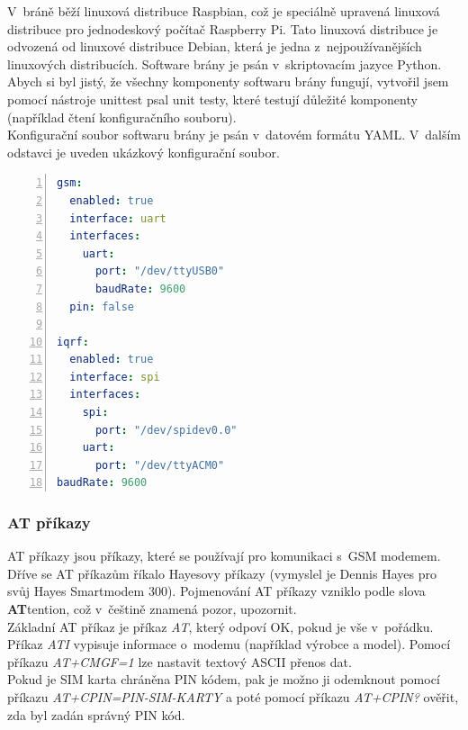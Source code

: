 \documentclass[12pt,a4paper,oneside]{article}
\begin{document}
V~bráně běží linuxová distribuce Raspbian, což je speciálně upravená linuxová distribuce pro jednodeskový počítač Raspberry Pi. Tato linuxová distribuce je odvozená od linuxové distribuce Debian, která je jedna z~nejpoužívanějších linuxových distribucích. Software brány je psán v~skriptovacím jazyce Python. Abych si byl jistý, že všechny komponenty softwaru brány fungují, vytvořil jsem pomocí nástroje unittest psal unit testy, které testují důležité komponenty (například čtení konfiguračního souboru). \\

Konfigurační soubor softwaru brány je psán v~datovém formátu YAML. V~dalším odstavci je uveden ukázkový konfigurační soubor.

\begin{lstlisting}[language=yaml, numbers=left]
gsm:
  enabled: true
  interface: uart
  interfaces:
    uart:
      port: "/dev/ttyUSB0"
      baudRate: 9600
  pin: false

iqrf:
  enabled: true
  interface: spi
  interfaces:
    spi:
      port: "/dev/spidev0.0"
    uart:
      port: "/dev/ttyACM0"
baudRate: 9600
\end{lstlisting}

\newpage

\subsubsection{AT příkazy}

AT příkazy jsou příkazy, které se používají pro komunikaci s~GSM modemem. Dříve se AT příkazům říkalo Hayesovy příkazy (vymyslel je Dennis Hayes pro svůj Hayes Smartmodem 300). Pojmenování AT příkazy vzniklo podle slova \textbf{AT}tention, což v~češtině znamená pozor, upozornit. \\

Základní AT příkaz je příkaz \textit{AT}, který odpoví OK, pokud je vše v~pořádku. Příkaz \textit{ATI} vypisuje informace o~modemu (například výrobce a model). Pomocí příkazu \textit{AT+CMGF=1} lze nastavit textový ASCII přenos dat. \\

Pokud je SIM karta chráněna PIN kódem, pak je možno ji odemknout pomocí příkazu \textit{AT+CPIN=PIN-SIM-KARTY} a poté pomocí příkazu \textit{AT+CPIN?} ověřit, zda byl zadán správný PIN kód. \\
\end{document}
